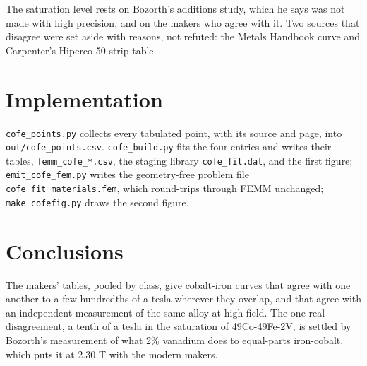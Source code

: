 \documentclass[
  11pt,
]{article}
\begin{document}
The saturation level rests on Bozorth's additions study, which he says was not made with high precision, and on the makers who agree with it. Two sources that disagree were set aside with reasons, not refuted: the Metals Handbook curve and Carpenter's Hiperco 50 strip table.

\section{Implementation}\label{implementation}

\texttt{cofe\_points.py} collects every tabulated point, with its source and page, into \texttt{out/cofe\_points.csv}. \texttt{cofe\_build.py} fits the four entries and writes their tables, \texttt{femm\_cofe\_*.csv}, the staging library \texttt{cofe\_fit.dat}, and the first figure; \texttt{emit\_cofe\_fem.py} writes the geometry-free problem file \texttt{cofe\_fit\_materials.fem}, which round-trips through FEMM unchanged; \texttt{make\_cofefig.py} draws the second figure.

\section{Conclusions}\label{conclusions}

The makers' tables, pooled by class, give cobalt-iron curves that agree with one another to a few hundredths of a tesla wherever they overlap, and that agree with an independent measurement of the same alloy at high field. The one real disagreement, a tenth of a tesla in the saturation of 49Co-49Fe-2V, is settled by Bozorth's measurement of what 2\% vanadium does to equal-parts iron-cobalt, which puts it at 2.30 T with the modern makers.
\end{document}
